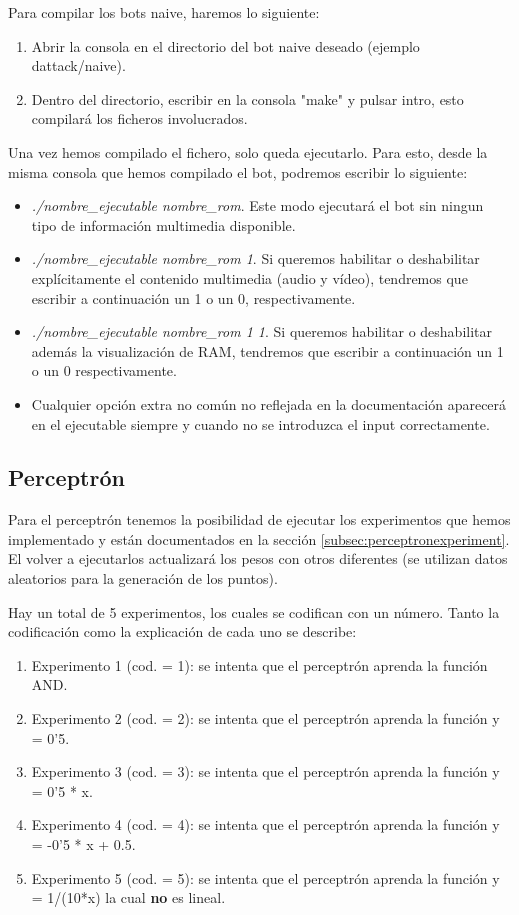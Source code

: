 Para compilar los bots naive, haremos lo siguiente:

\begin{enumerate}
	\item Abrir la consola en el directorio del bot naive deseado (ejemplo dattack/naive).
	\item Dentro del directorio, escribir en la consola "make" y pulsar intro, esto compilará los ficheros involucrados.
\end{enumerate}

Una vez hemos compilado el fichero, solo queda ejecutarlo. Para esto, desde la misma consola que hemos compilado el bot, podremos escribir lo siguiente:

\begin{itemize}
	\item \textit{./nombre\_ejecutable nombre\_rom}. Este modo ejecutará el bot sin ningun tipo de información multimedia disponible.
	\item \textit{./nombre\_ejecutable nombre\_rom 1}. Si queremos habilitar o deshabilitar explícitamente el contenido multimedia (audio y vídeo), tendremos que escribir a continuación un 1 o un 0, respectivamente.
	\item \textit{./nombre\_ejecutable nombre\_rom 1 1}. Si queremos habilitar o deshabilitar además la visualización de RAM, tendremos que escribir a continuación un 1 o un 0 respectivamente.
	\item Cualquier opción extra no común no reflejada en la documentación aparecerá en el ejecutable siempre y cuando no se introduzca el input correctamente.
\end{itemize}

\newpage
\subsection{Perceptrón}

Para el perceptrón tenemos la posibilidad de ejecutar los experimentos que hemos implementado y están documentados en la sección \ref{subsec:perceptronexperiment}. El volver a ejecutarlos actualizará los pesos con otros diferentes (se utilizan datos aleatorios para la generación de los puntos).

Hay un total de 5 experimentos, los cuales se codifican con un número. Tanto la codificación como la explicación de cada uno se describe:

\begin{enumerate}
    \item Experimento 1 (cod. = 1): se intenta que el perceptrón aprenda la función AND.
    \item Experimento 2 (cod. = 2): se intenta que el perceptrón aprenda la función y = 0'5.
    \item Experimento 3 (cod. = 3): se intenta que el perceptrón aprenda la función y = 0'5 * x.
    \item Experimento 4 (cod. = 4): se intenta que el perceptrón aprenda la función y = -0'5 * x + 0.5.
    \item Experimento 5 (cod. = 5): se intenta que el perceptrón aprenda la función y = 1/(10*x) la cual \textbf{no} es lineal.
\end{enumerate}

